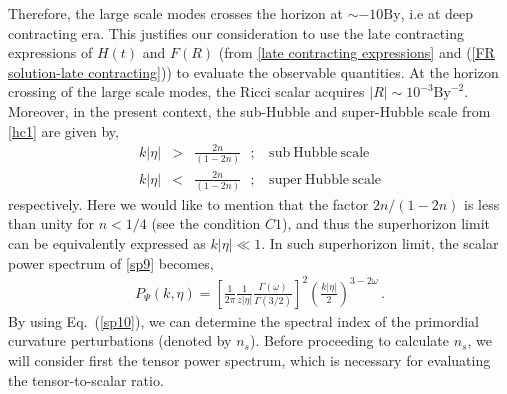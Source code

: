 \documentclass{article}
\begin{document}
Therefore, the large scale modes crosses the horizon at $\sim -10\mathrm{By}$, i.e at deep contracting era. This justifies our consideration 
to use the late contracting expressions of $H(t)$ and $F(R)$ (from \ref{late contracting expressions} and (\ref{FR solution-late contracting})) to evaluate 
the observable quantities. At the horizon crossing of the large scale modes, the Ricci scalar 
acquires $\left|R\right| \sim 10^{-3}\mathrm{By}^{-2}$. 
Moreover, in the present context, the sub-Hubble and super-Hubble scale from \ref{hc1} are given by,
\begin{eqnarray}
 k\left|\eta\right|&>&\frac{2n}{(1-2n)}~~~;~~~~\mathrm{sub~Hubble~scale}\nonumber\\
 k\left|\eta\right|&<&\frac{2n}{(1-2n)}~~~;~~~~\mathrm{super~Hubble~scale}
 \label{sub and super}
\end{eqnarray}
respectively. Here we would like to mention that the factor $2n/(1-2n)$ is less than unity for $n < 1/4$ (see the condition $C1$), 
and thus the superhorizon limit can be equivalently expressed as $k\left|\eta\right| \ll 1$. 
In such superhorizon limit, the scalar power spectrum of \ref{sp9} becomes,
\begin{align}
P_{\Psi}(k,\eta) = \left[\frac{1}{2\pi}\frac{1}{z|\eta|}
\frac{\Gamma(\omega)}{\Gamma(3/2)}\right]^2 \left(\frac{k|\eta|}{2}\right)^{3 - 2\omega}\, .
\label{sp10}
\end{align}
By using Eq.~(\ref{sp10}), we can determine the spectral index of the primordial curvature perturbations (denoted by $n_s$). Before proceeding 
to calculate $n_s$, we will consider first the tensor power spectrum, which is necessary for evaluating the tensor-to-scalar ratio.

\end{document}
